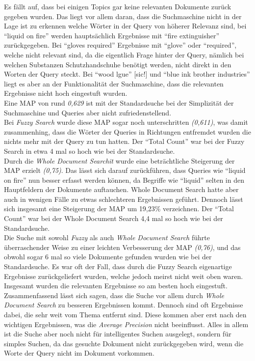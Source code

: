 \documentclass[oneside, a4paper, 12pt, titlepage]{article}
\begin{document}
Es fällt auf, dass bei einigen Topics gar keine relevanten Dokumente zurück gegeben wurden. Das liegt vor allem daran, dass die Suchmaschine nicht in der Lage ist zu erkennen welche Wörter in der Query von höherer Relevanz sind, bei ``liquid on fire'' werden hauptsächlich Ergebnisse mit ``fire extinguisher'' zurückgegeben.
Bei ``gloves required'' Ergebnisse mit ``glove'' oder ``required'', welche nicht relevant sind, da die eigentlich Frage hinter der Query, nämlich bei welchen Substanzen Schutzhandschuhe benötigt werden, nicht direkt in den Worten der Query steckt.
Bei ``wood lgue'' [sic!] und ``blue ink brother industries'' liegt es aber an der Funktionalität der Suchmaschine, dass die relevanten Ergebnisse nicht hoch eingestuft wurden.\\
Eine MAP von rund \textit{0,629} ist mit der Standardsuche bei der Simplizität der Suchmaschine und Queries aber nicht zufriedenstellend.\\
Bei \textit{Fuzzy Search} wurde diese MAP sogar noch unterschritten \textit{(0,611)}, was damit zusammenhing, dass die Wörter der Queries in Richtungen entfremdet wurden die nichts mehr mit der Query zu tun hatten.
Der ``Total Count'' war bei der Fuzzy Search in etwa 4 mal so hoch wie bei der Standardsuche.\\
Durch die \textit{Whole Document Searchit} wurde eine beträchtliche Steigerung der MAP erzielt \textit{(0,75)}.
Das lässt sich darauf zurückführen, dass Queries wie ``liquid on fire'' nun besser erfasst werden können, da Begriffe wie ``liquid'' selten in den Hauptfeldern der Dokumente auftauchen.
Whole Document Search hatte aber auch in wenigen Fälle zu etwas schlechteren Ergebnissen geführt.
Dennoch lässt sich insgesamt eine Steigerung der MAP um 19,23\% verzeichnen.
Der ``Total Count'' war bei der Whole Document Search 4,4 mal so hoch wie bei der Standardsuche.\\
Die Suche mit sowohl \textit{Fuzzy} als auch \textit{Whole Document Search} führte überraschender Weise zu einer leichten Verbesserung der MAP \textit{(0,76)}, und das obwohl sogar 6 mal so viele Dokumente gefunden wurden wie bei der Standardsuche.
Es war oft der Fall, dass durch die Fuzzy Search eigenartige Ergebnisse zurückgeliefert wurden, welche jedoch meirst nicht weit oben waren.
Insgesamt wurden die relevanten Ergebnisse so am besten hoch eingestuft.\\

Zusammenfassend lässt sich sagen, dass die Suche vor allem durch \textit{Whole Document Search} zu besseren Ergebnissen kommt.
Dennoch sind oft Ergebnisse dabei, die sehr weit vom Thema entfernt sind. Diese kommen aber erst nach den wichtigen Ergebnissen, was die \textit{Average Precision} nicht beeinflusst.
Alles in allem ist die Suche aber noch nicht für intelligentes Suchen ausgelegt, sondern für simples Suchen, da das gesuchte Dokument nicht zurückgegeben wird, wenn die Worte der Query nicht im Dokument vorkommen. 
\end{document}
